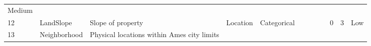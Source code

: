 \documentclass[11pt]{article}
\begin{document}
\begin{longtable}[]{@{}llllllllllll@{}}
\begin{minipage}[t]{0.04\columnwidth}
Medium\strut
\end{minipage}\tabularnewline
\begin{minipage}[t]{0.04\columnwidth}\raggedright\strut
12\strut
\end{minipage} & \begin{minipage}[t]{0.04\columnwidth}\raggedright\strut
LandSlope\strut
\end{minipage} & \begin{minipage}[t]{0.04\columnwidth}\raggedright\strut
Slope of property\strut
\end{minipage} & \begin{minipage}[t]{0.04\columnwidth}\raggedright\strut
Location\strut
\end{minipage} & \begin{minipage}[t]{0.04\columnwidth}\raggedright\strut
Categorical\strut
\end{minipage} & \begin{minipage}[t]{0.04\columnwidth}\raggedright\strut
\strut
\end{minipage} & \begin{minipage}[t]{0.04\columnwidth}\raggedright\strut
\strut
\end{minipage} & \begin{minipage}[t]{0.04\columnwidth}\raggedright\strut
\strut
\end{minipage} & \begin{minipage}[t]{0.04\columnwidth}\raggedright\strut
\strut
\end{minipage} & \begin{minipage}[t]{0.04\columnwidth}\raggedright\strut
0\strut
\end{minipage} & \begin{minipage}[t]{0.04\columnwidth}\raggedright\strut
3\strut
\end{minipage} & \begin{minipage}[t]{0.04\columnwidth}\raggedright\strut
Low\strut
\end{minipage}\tabularnewline
\begin{minipage}[t]{0.04\columnwidth}\raggedright\strut
13\strut
\end{minipage} & \begin{minipage}[t]{0.04\columnwidth}\raggedright\strut
Neighborhood\strut
\end{minipage} & \begin{minipage}[t]{0.04\columnwidth}\raggedright\strut
Physical locations within Ames city limits\strut
\end{minipage} & \begin{minipage}[t]{0.04\columnwidth}\raggedright\strut

\end{minipage}
\end{longtable}
\end{document}

